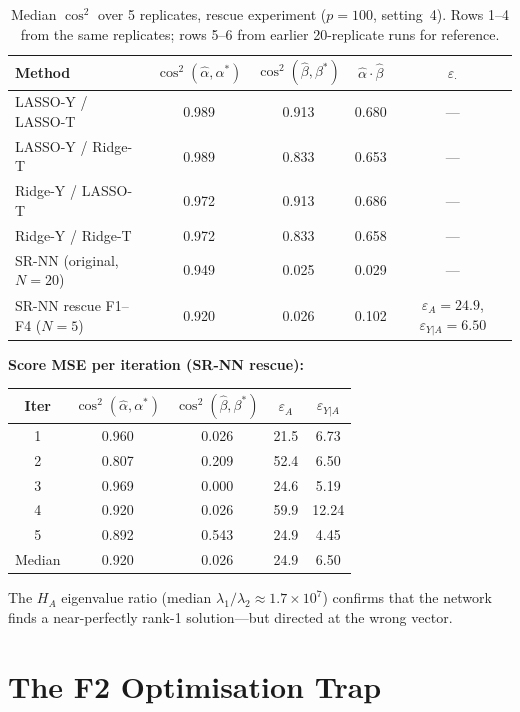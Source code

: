 \documentclass[11pt]{article}
\newcommand{\hatbeta}{\hat\beta}
\begin{document}
\begin{table}[h]
\centering
\caption{Median $\cos^2$ over 5 replicates, rescue experiment ($p=100$, setting~4).
  Rows 1--4 from the same replicates; rows 5--6 from earlier 20-replicate runs
  for reference.}
\label{tab:results}
\begin{tabular}{lcccc}
\toprule
Method & $\cos^2(\hat\alpha,\alpha^*)$ & $\cos^2(\hatbeta,\beta^*)$
       & $\hat\alpha\cdot\hat\beta$ & $\varepsilon_{\cdot}$\\
\midrule
LASSO-Y / LASSO-T  & 0.989 & 0.913 & 0.680 & ---\\
LASSO-Y / Ridge-T  & 0.989 & 0.833 & 0.653 & ---\\
Ridge-Y / LASSO-T  & 0.972 & 0.913 & 0.686 & ---\\
Ridge-Y / Ridge-T  & 0.972 & 0.833 & 0.658 & ---\\
\midrule
SR-NN (original, $N=20$) & 0.949 & 0.025 & 0.029 & ---\\
SR-NN rescue F1--F4 ($N=5$)
  & 0.920 & 0.026 & 0.102
  & $\varepsilon_A=24.9$, $\varepsilon_{Y|A}=6.50$\\
\bottomrule
\end{tabular}
\end{table}

\noindent
\textbf{Score MSE per iteration (SR-NN rescue):}
\begin{center}
\begin{tabular}{ccccc}
\toprule
Iter & $\cos^2(\hat\alpha,\alpha^*)$ & $\cos^2(\hat\beta,\beta^*)$ & $\varepsilon_A$ & $\varepsilon_{Y|A}$\\
\midrule
1 & 0.960 & 0.026 & 21.5 & 6.73\\
2 & 0.807 & 0.209 & 52.4 & 6.50\\
3 & 0.969 & 0.000 & 24.6 & 5.19\\
4 & 0.920 & 0.026 & 59.9 & 12.24\\
5 & 0.892 & 0.543 & 24.9 & 4.45\\
\midrule
Median & 0.920 & 0.026 & 24.9 & 6.50\\
\bottomrule
\end{tabular}
\end{center}

\medskip\noindent
The $H_A$ eigenvalue ratio (median $\lambda_1/\lambda_2\approx 1.7\times 10^7$)
confirms that the network finds a near-perfectly rank-1 solution—but directed
at the wrong vector.

\section{The F2 Optimisation Trap}
\label{sec:trap}
\end{document}
